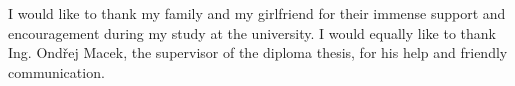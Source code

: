 \documentclass[11pt,twoside,a4paper]{book}
\begin{document}
	
	\translate				%

	


	\coverpagestarts


	\acknowledgements
	\noindent
	I would like to thank my family and my girlfriend for their immense support and encouragement during my study at the university. I would equally like to thank Ing. Ondřej Macek, the supervisor of the diploma thesis, for his help and friendly communication.



\end{document}
